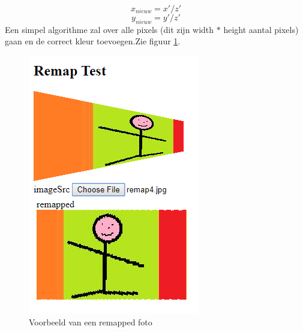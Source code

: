 $$x_{nieuw} = x'/z'$$  
$$y_{nieuw} = y'/z'$$
Een simpel algorithme zal over alle pixels (dit zijn width $ * $ height aantal pixels) gaan en de correct kleur toevoegen.Zie figuur \ref{mappedfoto}.\cite{map}
\begin{figure}
\center
\includegraphics[scale=1]{remapEx}
\caption{Voorbeeld van een remapped foto}
\label{mappedfoto}
\end{figure}




